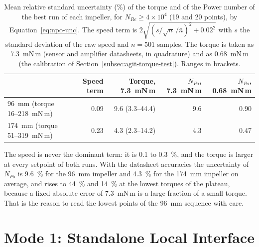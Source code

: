 \begin{table}[htbp]
    \centering
    \caption[Uncertainty of the Power number at the plateau]{Mean relative standard uncertainty (\%) of the torque and of the Power number of the best run of each impeller, for $N_{Re} \geq 4\times10^{4}$ (19 and 20 points), by Equation~\ref{eq:npo-unc}. The speed term is $2\sqrt{(s/\sqrt{n}\,/\bar{n})^{2} + 0.02^{2}}$ with $s$ the standard deviation of the raw speed and $n = 501$ samples. The torque is taken as 7.3~mN\,m (sensor and amplifier datasheets, in quadrature) and as 0.68~mN\,m (the calibration of Section~\ref{subsec:agit-torque-test}). Ranges in brackets.}
    \label{tab:upo}
    \small
    \begin{tabular}{@{}lrrrr@{}}
        \toprule
        & Speed term & Torque, 7.3~mN\,m & $N_{Po}$, 7.3~mN\,m & $N_{Po}$, 0.68~mN\,m \\
        \midrule
        96~mm (torque 16--218~mN\,m) & 0.09 & 9.6 (3.3--44.4) & 9.6 & 0.90 \\
        174~mm (torque 51--319~mN\,m) & 0.23 & 4.3 (2.3--14.2) & 4.3 & 0.47 \\
        \bottomrule
    \end{tabular}
\end{table}

The speed is never the dominant term: it is 0.1 to 0.3~\%, and the torque is larger at every setpoint of both runs. With the datasheet accuracies the uncertainty of $N_{Po}$ is 9.6~\% for the 96~mm impeller and 4.3~\% for the 174~mm impeller on average, and rises to 44~\% and 14~\% at the lowest torques of the plateau, because a fixed absolute error of 7.3~mN\,m is a large fraction of a small torque. That is the reason to read the lowest points of the 96~mm sequence with care.



\section{Mode 1: Standalone Local Interface}
\label{sec:agit-mode1}

